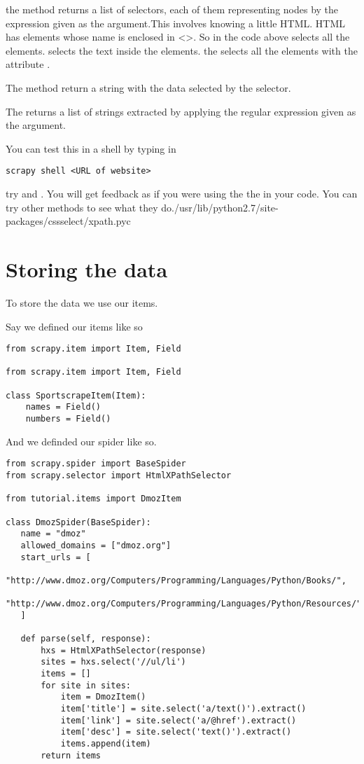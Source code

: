 the  method returns a list of selectors, each of them representing nodes by the expression given as the argument.This involves knowing a little HTML. HTML has elements whose name is enclosed in <>. So in the code above  selects  all the  elements.  selects the text inside the  elements. the  selects all the  elements with the attribute .  

The  method return a string with the data selected by the selector.

The  returns a list of strings extracted by applying the regular expression given as the argument.

You can test this in a shell by typing in
\begin{lstlisting}
scrapy shell <URL of website>
\end{lstlisting}

try  and . You will get feedback as if you were using the the  in your code. You can try other methods to see what they do./usr/lib/python2.7/site-packages/cssselect/xpath.pyc

\section*{Storing the data}
To store the data we use our items. 

Say we defined our items like so
\begin{lstlisting}
from scrapy.item import Item, Field

from scrapy.item import Item, Field

class SportscrapeItem(Item):
    names = Field()
    numbers = Field()
\end{lstlisting}

And we definded our spider like so.
\begin{lstlisting}
from scrapy.spider import BaseSpider
from scrapy.selector import HtmlXPathSelector

from tutorial.items import DmozItem

class DmozSpider(BaseSpider):
   name = "dmoz"
   allowed_domains = ["dmoz.org"]
   start_urls = [
       "http://www.dmoz.org/Computers/Programming/Languages/Python/Books/",
       "http://www.dmoz.org/Computers/Programming/Languages/Python/Resources/"
   ]

   def parse(self, response):
       hxs = HtmlXPathSelector(response)
       sites = hxs.select('//ul/li')
       items = []
       for site in sites:
           item = DmozItem()
           item['title'] = site.select('a/text()').extract()
           item['link'] = site.select('a/@href').extract()
           item['desc'] = site.select('text()').extract()
           items.append(item)
       return items
\end{lstlisting}

